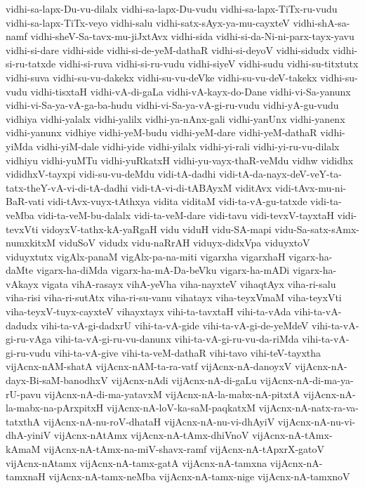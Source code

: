 {vidhi-sa-lapx-Du-vu-dilalx
vidhi-sa-lapx-Du-vudu
vidhi-sa-lapx-TiTx-ru-vudu
vidhi-sa-lapx-TiTx-veyo
vidhi-salu
vidhi-satx-sAyx-ya-mu-cayxteV
vidhi-shA-sa-namf
vidhi-sheV-Sa-tavx-mu-jiJxtAvx
vidhi-sida
vidhi-si-da-Ni-ni-parx-tayx-yavu
vidhi-si-dare
vidhi-side
vidhi-si-de-yeM-dathaR
vidhi-si-deyoV
vidhi-sidudx
vidhi-si-ru-tatxde
vidhi-si-ruva
vidhi-si-ru-vudu
vidhi-siyeV
vidhi-sudu
vidhi-su-titxtutx
vidhi-suva
vidhi-su-vu-dakekx
vidhi-su-vu-deVke
vidhi-su-vu-deV-takekx
vidhi-su-vudu
vidhi-tisxtaH
vidhi-vA-di-gaLa
vidhi-vA-kayx-do-Dane
vidhi-vi-Sa-yanunx
vidhi-vi-Sa-ya-vA-ga-ba-hudu
vidhi-vi-Sa-ya-vA-gi-ru-vudu
vidhi-yA-gu-vudu
vidhiya
vidhi-yalalx
vidhi-yalilx
vidhi-ya-nAnx-gali
vidhi-yanUnx
vidhi-yanenx
vidhi-yanunx
vidhiye
vidhi-yeM-budu
vidhi-yeM-dare
vidhi-yeM-dathaR
vidhi-yiMda
vidhi-yiM-dale
vidhi-yide
vidhi-yilalx
vidhi-yi-rali
vidhi-yi-ru-vu-dilalx
vidhiyu
vidhi-yuMTu
vidhi-yuRkatxH
vidhi-yu-vayx-thaR-veMdu
vidhw
vididhx
vididhxV-tayxpi
vidi-su-vu-deMdu
vidi-tA-dadhi
vidi-tA-da-nayx-deV-veY-ta-tatx-theY-vA-vi-di-tA-dadhi
vidi-tA-vi-di-tABAyxM
viditAvx
vidi-tAvx-mu-ni-BaR-vati
vidi-tAvx-vuyx-tAthxya
vidita
viditaM
vidi-ta-vA-gu-tatxde
vidi-ta-veMba
vidi-ta-veM-bu-dalalx
vidi-ta-veM-dare
vidi-tavu
vidi-tevxV-tayxtaH
vidi-tevxVti
vidoyxV-tathx-kA-yaRgaH
vidu
viduH
vidu-SA-mapi
vidu-Sa-satx-sAmx-numxkitxM
viduSoV
vidudx
vidu-naRrAH
viduyx-didxVpa
viduyxtoV
viduyxtutx
vigAlx-panaM
vigAlx-pa-na-miti
vigarxha
vigarxhaH
vigarx-ha-daMte
vigarx-ha-diMda
vigarx-ha-mA-Da-beVku
vigarx-ha-mADi
vigarx-ha-vAkayx
vigata
vihA-rasayx
vihA-yeVha
viha-nayxteV
vihaqtAyx
viha-ri-salu
viha-risi
viha-ri-sutAtx
viha-ri-su-vanu
vihatayx
viha-teyxVmaM
viha-teyxVti
viha-teyxV-tuyx-cayxteV
vihayxtayx
vihi-ta-tavxtaH
vihi-ta-vAda
vihi-ta-vA-dadudx
vihi-ta-vA-gi-dadxrU
vihi-ta-vA-gide
vihi-ta-vA-gi-de-yeMdeV
vihi-ta-vA-gi-ru-vAga
vihi-ta-vA-gi-ru-vu-danunx
vihi-ta-vA-gi-ru-vu-da-riMda
vihi-ta-vA-gi-ru-vudu
vihi-ta-vA-give
vihi-ta-veM-dathaR
vihi-tavo
vihi-teV-tayxtha
vijAcnx-nAM-shatA
vijAcnx-nAM-ta-ra-vatf
vijAcnx-nA-danoyxV
vijAcnx-nA-dayx-Bi-saM-banodhxV
vijAcnx-nAdi
vijAcnx-nA-di-gaLu
vijAcnx-nA-di-ma-ya-rU-pavu
vijAcnx-nA-di-ma-yatavxM
vijAcnx-nA-la-mabx-nA-pitxtA
vijAcnx-nA-la-mabx-na-pArxpitxH
vijAcnx-nA-loV-ka-saM-paqkatxM
vijAcnx-nA-natx-ra-va-tatxthA
vijAcnx-nA-nu-roV-dhataH
vijAcnx-nA-nu-vi-dhAyiV
vijAcnx-nA-nu-vi-dhA-yiniV
vijAcnx-nAtAmx
vijAcnx-nA-tAmx-dhiVnoV
vijAcnx-nA-tAmx-kAmaM
vijAcnx-nA-tAmx-na-miV-shavx-ramf
vijAcnx-nA-tApxrX-gatoV
vijAcnx-nAtamx
vijAcnx-nA-tamx-gatA
vijAcnx-nA-tamxna
vijAcnx-nA-tamxnaH
vijAcnx-nA-tamx-neMba
vijAcnx-nA-tamx-nige
vijAcnx-nA-tamxnoV
}
